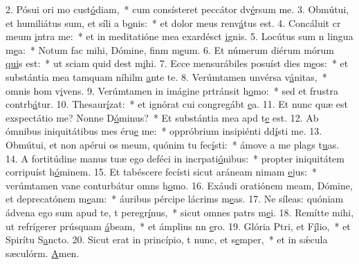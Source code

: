 2. Pósui ori mo cust\uline{ó}diam,~* cum consísteret peccátor dv\uline{é}rsum me.
3. Obmútui, et humiliátus sum, et síli a b\uline{o}nis:~* et dolor meus renv\uline{á}tus est.
4. Concáluit cr meum \uline{i}ntra me:~* et in meditatióne mea exardésct \uline{i}gnis.
5. Locútus sum n lingua m\uline{e}a:~* Notum fac mihi, Dómine, finm m\uline{e}um.
6. Et númerum diérum mórum \uline{qui}s est:~* ut sciam quid dest m\uline{i}hi.
7. Ecce mensurábiles posuíst dies m\uline{e}os:~* et substántia mea tamquam níhilm \uline{a}nte te.
8. Verúmtamen unvérsa v\uline{á}nitas,~* omnis hom v\uline{i}vens.
9. Verúmtamen in imágine prtránsit h\uline{o}mo:~* sed et frustra contrb\uline{á}tur.
10. Thesaur\uline{í}zat:~* et ignórat cui congregábt \uline{e}a.
11. Et nunc quæ est exspectátio me? Nonne D\uline{ó}minus?~* Et substántia mea apd t\uline{e} est.
12. Ab ómnibus iniquitátibus mes éru\uline{e} me:~* oppróbrium insipiénti dd\uline{í}sti me.
13. Obmútui, et non apérui os meum, quónim tu fec\uline{í}sti:~* ámove a me plags t\uline{u}as.
14. A fortitúdine manus tuæ ego deféci in incrpati\uline{ó}nibus:~* propter iniquitátem corripuíst h\uline{ó}minem.
15. Et tabéscere fecísti sicut aráneam nimam \uline{e}jus:~* verúmtamen vane conturbátur omns h\uline{o}mo.
16. Exáudi oratiónem meam, Dómine, et deprecatónem m\uline{e}am:~* áuribus pércipe lácrims m\uline{e}as.
17. Ne síleas: quóniam ádvena ego sum apud te, t peregr\uline{í}nus,~* sicut omnes patrs m\uline{e}i.
18. Remítte mihi, ut refrígerer prúsquam \uline{á}beam,~* et ámplius nn \uline{e}ro.
19. Glória Ptri, et F\uline{í}lio,~* et Spirítu S\uline{a}ncto.
20. Sicut erat in princípio, t nunc, et s\uline{e}mper,~* et in sǽcula sæculórm. \uline{A}men.
